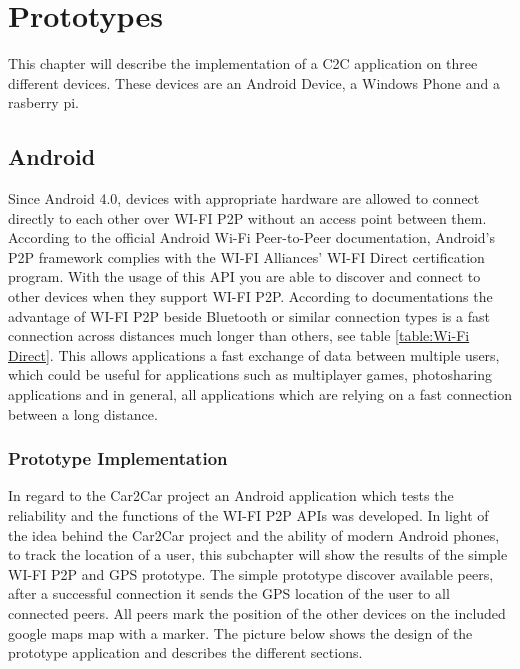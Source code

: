 \chapter{Prototypes}
\label{cha:Prototypes}
This chapter will describe the implementation of a C2C application on three different devices. These devices are an Android Device, a Windows Phone and a rasberry pi.

\section{Android}
Since Android 4.0, devices with appropriate hardware are allowed to connect directly to each other over WI-FI P2P without an access point between them. According to the official Android Wi-Fi Peer-to-Peer documentation, Android's P2P framework complies with the WI-FI Alliances' WI-FI Direct certification program. With the usage of this API you are able to discover and connect to other devices when they support WI-FI P2P.  According to documentations the advantage of WI-FI P2P beside Bluetooth or similar connection types is a fast connection across distances much longer than others, see table \ref{table:Wi-Fi Direct}. This allows applications a fast exchange of data between multiple users, which could be useful for applications such as multiplayer games, photosharing applications and in general, all applications which are relying on a fast connection between a long distance.

\subsection*{Prototype Implementation}
\label{subsec:AndroidPrototype}
In regard to the Car2Car project an Android application which tests the reliability and the functions of the WI-FI P2P APIs was developed. In light of the idea behind the Car2Car project and the ability of modern Android phones, to track the location of a user, this subchapter will show the results of the simple WI-FI P2P and GPS prototype.
The simple prototype discover available peers, after a successful connection it  sends the GPS location of the user to all connected peers. All peers mark the position of the other devices on the included google maps map with a marker. The picture below shows the design of the prototype application and describes the different sections.

